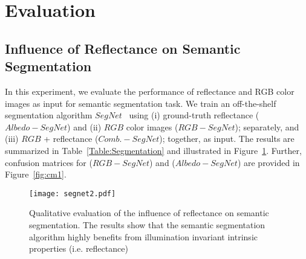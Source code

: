 \documentclass[runningheads]{llncs}
\begin{document}
\section{Evaluation}

\subsection{Influence of Reflectance on Semantic Segmentation}
In this experiment, we evaluate the performance of reflectance and RGB color images as input for semantic segmentation task. We train an off-the-shelf segmentation algorithm $SegNet$~\cite{segnet} using (i) ground-truth reflectance ($Albedo-SegNet$) and (ii) $RGB$ color images ($RGB-SegNet$); separately, and (iii) $RGB$ + reflectance ($Comb.-SegNet$); together, as input. The results are summarized in Table~\ref{Table:Segmentation} and illustrated in Figure~\ref{fig:segnet2}. Further, confusion matrices for ($RGB-SegNet$) and ($Albedo-SegNet$) are provided in Figure~\ref{fig:cm1}.

\begin{figure}[t]
    \centering
    \texttt{[image: segnet2.pdf]}
    \caption{Qualitative evaluation of the influence of reflectance on semantic segmentation. The results show that the semantic segmentation algorithm highly benefits from illumination invariant intrinsic properties (i.e. reflectance)}
    \label{fig:segnet2}
\end{figure}

\begin{table}[]
\centering
\caption{Semantic segmentation accuracy using albedo and $RGB$ images as inputs. Using albedo images significantly outperforms $RGB$ images}
\label{Table:Segmentation}
\end{table}
\end{document}
